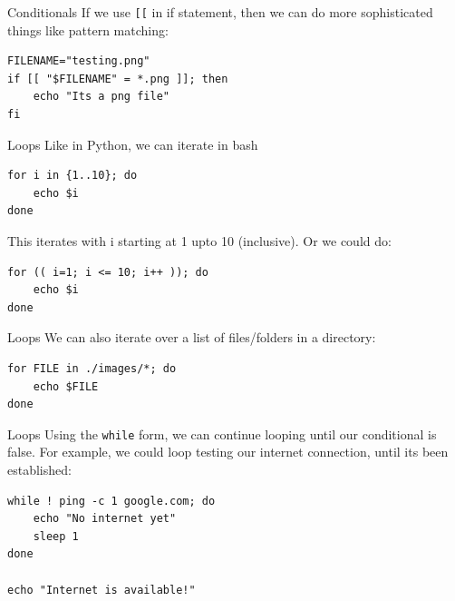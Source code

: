 \documentclass[10pt]{beamer}
\begin{document}
\begin{frame}[label={sec:org1066a4b},fragile]{Conditionals}
 If we use \texttt{[[} in if statement, then we can do more sophisticated things like
pattern matching:

\begin{verbatim}
FILENAME="testing.png"
if [[ "$FILENAME" = *.png ]]; then
    echo "Its a png file"
fi
\end{verbatim}
\end{frame}

\begin{frame}[label={sec:org496c849},fragile]{Loops}
 Like in Python, we can iterate in bash

\begin{verbatim}
for i in {1..10}; do
    echo $i
done
\end{verbatim}

This iterates with i starting at 1 upto 10 (inclusive). Or we could do:

\begin{verbatim}
for (( i=1; i <= 10; i++ )); do
    echo $i
done
\end{verbatim}
\end{frame}

\begin{frame}[label={sec:orgc0bd090},fragile]{Loops}
 We can also iterate over a list of files/folders in a directory:

\begin{verbatim}
for FILE in ./images/*; do
    echo $FILE
done
\end{verbatim}
\end{frame}

\begin{frame}[label={sec:org2601eb2},fragile]{Loops}
 Using the \texttt{while} form, we can continue looping until our conditional is
false. For example, we could loop testing our internet connection, until its
been established:

\begin{verbatim}
while ! ping -c 1 google.com; do
    echo "No internet yet"
    sleep 1
done

echo "Internet is available!"
\end{verbatim}
\end{frame}
\end{document}
